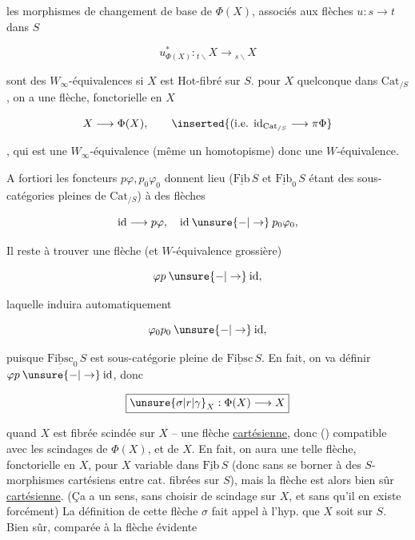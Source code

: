  les morphismes de changement de base de $\Phi(X)$, associés aux flèches $u:s\longrightarrow t$ dans $S$

\[
 u^*_{\Phi(X)}:{}_{t\backslash}X\longrightarrow{}_{s\backslash}X
\]

sont des $W_\infty$-équivalences si $X$ est $\mathrm{Hot}$-fibré sur $S$.   pour $X$ quelconque dans $\mathrm{Cat}_{/S}$, on a une flèche, fonctorielle en $X$

\[
 X\longrightarrow\Phi(X),\qquad\inserted{(\text{i.e. }\mathrm{id}_{\mathrm{Cat}_{/S}}\longrightarrow\pi\Phi}
\]

, qui est une $W_\infty$-équivalence (même un homotopisme) donc une $W$-équivalence.

A fortiori les foncteurs $p\varphi,p_0\varphi_0$ donnent lieu ($\underline{\mathrm{Fib}}\,S$ et $\underline{\mathrm{Fib}}_0\,S$ étant des sous-catégories pleines de $\mathrm{Cat}_{/S}$) à des flèches

\[
 \mathrm{id}\longrightarrow p\varphi,\quad\mathrm{id}\mathbin{\unsure{-|\to}}p_0\varphi_0,
\]

Il reste à trouver une flèche (et $W$-équivalence grossière)

\[
 \varphi p\mathbin{\unsure{-|\to}}\mathrm{id},
\]

laquelle induira automatiquement

\[
 \varphi_0p_0\mathbin{\unsure{-|\to}}\mathrm{id},
\]

puisque $\underline{\mathrm{Fibsc}}_0\,S$ est sous-catégorie pleine de $\underline{\mathrm{Fibsc}}\,S$. En fait, on va définir $\varphi p\mathbin{\unsure{-|\to}}\mathrm{id}$, donc

\[
 \boxed{\unsure{\sigma|r|\gamma}_X:\Phi(X)\longrightarrow X}
\]

quand $X$ est fibrée scindée sur $X$ -- une flèche \uline{cartésienne}, donc () compatible avec les scindages de $\Phi(X)$, et de $X$. En fait, on aura une telle  flèche, fonctorielle en $X$, pour $X$ variable dans $\underline{\mathrm{Fib}}\,S$ (donc sans se borner à des $S$-morphismes cartésiens entre cat. fibrées sur $S$), mais la flèche est alors bien sûr \uline{cartésienne}. (Ça a un sens, sans choisir de scindage sur $X$, et sans qu'il en existe forcément) La définition de cette flèche $\sigma$ fait appel   à l'hyp. que $X$ soit   sur $S$. Bien sûr, comparée à la flèche  évidente

